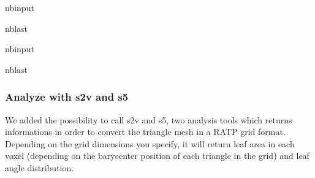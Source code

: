 \documentclass[letterpaper,10pt,english]{sphinxmanual}
\begin{document}
\begin{sphinxuseclass}{nbinput}
\begin{sphinxuseclass}{nblast}
{
\begin{sphinxVerbatim}[commandchars=\\\{\}]
\llap{\color{nbsphinxin}[18]:\,\hspace{\fboxrule}\hspace{\fboxsep}}  
  
  
  
\end{sphinxVerbatim}
}

\end{sphinxuseclass}
\end{sphinxuseclass}
\begin{sphinxuseclass}{nbinput}
\begin{sphinxuseclass}{nblast}
{
\begin{sphinxVerbatim}[commandchars=\\\{\}]
\llap{\color{nbsphinxin}[19]:\,\hspace{\fboxrule}\hspace{\fboxsep}}  
\end{sphinxVerbatim}
}

\end{sphinxuseclass}
\end{sphinxuseclass}

\subsubsection{Analyze with s2v and s5}
\label{\detokenize{misc_functionnalities:Analyze-with-s2v-and-s5}}
\sphinxAtStartPar
We added the possibility to call s2v and s5, two analysis tools which returns informations in order to convert the triangle mesh in a RATP grid format. Depending on the grid dimensions you specify, it will return leaf area in each voxel (depending on the barycenter position of each triangle in the grid) and leaf angle distribution.
\end{document}
